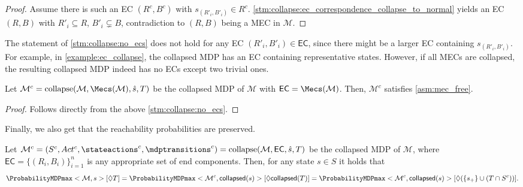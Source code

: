 \documentclass{theoretics}
\newcommand{\unionSym}{\cup}
\newcommand{\unionBin}{\mathbin{\unionSym}}
\newcommand{\intersectionSym}{\cap}
\newcommand{\intersectionBin}{\mathbin{\intersectionSym}}
\newcommand{\union}{\unionBin}
\newcommand{\intersection}{\intersectionBin}
\newcommand{\MDP}{\mathcal{M}}
\newcommand{\States}{S}
\newcommand{\initialstate}{\hat{s}}
\newcommand{\Actions}{Act}
\newcommand{\reach}{\Diamond}
\newcommand{\targetstate}{s_+}
\newcommand{\targetset}{T}
\DeclareMathOperator{\collapse}{collapse}
\newcommand{\eccollapsed}{\mathsf{collapsed}}
\newcommand{\algoecs}{\mathsf{EC}}
\begin{document}
\begin{proof}
	Assume there is such an EC $(R^c, B^c)$ with $s_{(R'_i, B'_i)} \in R^c$.
	\cref{stm:collapse:ec_correspondence_collapse_to_normal} yields an EC $(R, B)$ with $R'_i \subseteq R$, $B'_i \subsetneq B$, contradiction to $(R, B)$ being a MEC in $\MDP$. 
\end{proof}
The statement of \cref{stm:collapse:no_ecs} does not hold for any EC $(R'_i, B'_i) \in \algoecs$, since there might be a larger EC containing $s_{(R'_i, B'_i)}$.
For example, in \cref{example:ec_collapse}, the collapsed MDP has an EC containing representative states.
However, if all MECs are collapsed, the resulting collapsed MDP indeed has no ECs except two trivial ones.
\begin{corollary}
	Let $\MDP^c = \collapse(\MDP, \Mecs(\MDP), \initialstate, \targetset)$ be the collapsed MDP of $\MDP$ with $\algoecs = \Mecs(\MDP)$.
	Then, $\MDP^c$ satisfies \cref{asm:mec_free}.
\end{corollary}

\begin{proof}
	Follows directly from the above \cref{stm:collapse:no_ecs}. 
\end{proof}
Finally, we also get that the reachability probabilities are preserved.
\begin{lemma} \label{stm:collapse:reachability_equal}
	Let $\MDP^c = (\States^c, \Actions^c, \stateactions^c, \mdptransitions^c) = \collapse(\MDP, \algoecs, \initialstate, \targetset)$ be the collapsed MDP of $\MDP$, where $\algoecs = \{(R_i,B_i)\}_{i=1}^n$ is any appropriate set of end components.
	Then, for any state $s \in \States$ it holds that
	\begin{equation*}
		\ProbabilityMDPmax<\MDP, s>[\reach \targetset] = \ProbabilityMDPmax<\MDP^c, \eccollapsed(s)>[\reach \eccollapsed(\targetset)] = \ProbabilityMDPmax<\MDP^c, \eccollapsed(s)>[\reach (\{\targetstate\} \union (\targetset \intersection \States^c))].
	\end{equation*}
\end{lemma}
\end{document}
